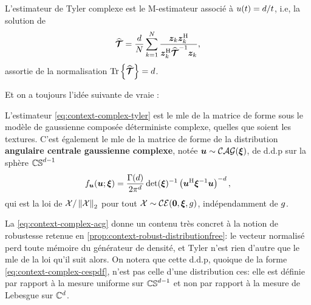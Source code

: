 \begin{definition}
\label{def:context-complex-tyler}
  L'estimateur de Tyler complexe est le M-estimateur associé à $u(t)=d/t$, i.e, la solution de
  \begin{equation}
    \widehat{\bm{\mathcal{T}}}
    =
    \frac{d}{N}\sum_{k=1}^{N}
    \frac{\boldsymbol{z}_k\boldsymbol{z}_k^{\mathrm{H}}}{\boldsymbol{z}_k^{\mathrm{H}} {\widehat{\bm{\mathcal{T}}}}^{-1} \boldsymbol{z}_k},
    \label{eq:context-complex-tyler}
  \end{equation}
  assortie de la normalisation $\operatorname{\operatorname{Tr}}\left\{\widehat{\bm{\mathcal{T}}}\right\}=d$.
\end{definition}

Et on a toujours l'idée suivante de vraie :

\begin{property}
\label{prop:context-complex-tylerdf}
  L'estimateur \cref{eq:context-complex-tyler} est le mle de la matrice de forme sous le modèle de gaussienne composée déterministe complexe, quelles que soient les textures. C'est également le mle de la matrice de forme de la distribution \textbf{angulaire centrale gaussienne complexe}, notée $\boldsymbol{u}\sim\mathcal{CAG}(\boldsymbol{\xi})$, de d.d.p sur la sphère $\mathbb{CS}^{d-1}$
  \begin{equation}
    f_{\boldsymbol{u}}(\boldsymbol{u};\boldsymbol{\xi})
    =
    \frac{\Gamma(d)}{2\pi^d}\operatorname{\operatorname{det}}(\boldsymbol{\xi})^{-1}
    \left(\boldsymbol{u}^{\mathrm{H}} {\boldsymbol{\xi}}^{-1} \boldsymbol{u}\right)^{-d},
    \label{eq:context-complex-acg}
  \end{equation}
  qui est la loi de $\mathcal{X}/\left\lVert\mathcal{X}\right\rVert_2$ pour tout $\mathcal{X}\sim\mathcal{CE}(\boldsymbol{0},\boldsymbol{\xi},g)$, indépendamment de $g$.
\end{property}

\begin{remark}
  La \cref{eq:context-complex-acg} donne un contenu très concret à la notion de robustesse retenue en \cref{prop:context-robust-distributionfree}: le vecteur normalisé perd toute mémoire du générateur de densité, et Tyler n'est rien d'autre que le mle de la loi qu'il suit alors. On notera que cette d.d.p, quoique de la forme \cref{eq:context-complex-cespdf}, n'est pas celle d'une distribution ces: elle est définie par rapport à la mesure uniforme sur $\mathbb{CS}^{d-1}$ et non par rapport à la mesure de Lebesgue sur $\mathbb{C}^d$.
\end{remark}

